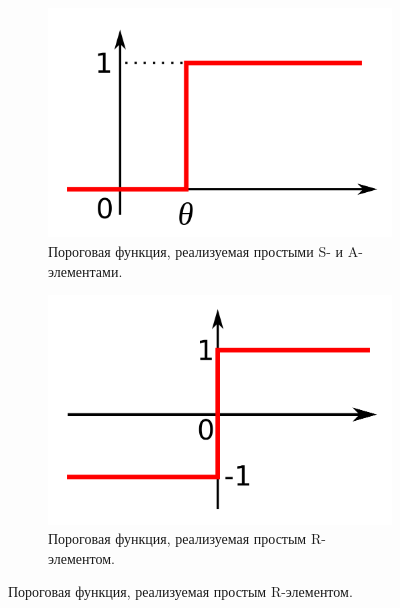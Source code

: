 \documentclass[paper=a4, fontsize=11pt]{scrartcl} %
\numberwithin{equation}{section} %
\numberwithin{figure}{section} %
\numberwithin{table}{section} %
\begin{document}
	
	\begin{figure}[h!]
		\centering
		\begin{subfigure}[b]{0.3\textwidth}
			\includegraphics[width=\textwidth]{S-A}
			\caption{Пороговая функция, реализуемая простыми S- и A-элементами.}
		\end{subfigure}
		\begin{subfigure}[b]{0.3\textwidth}
			\includegraphics[width=\textwidth]{R}
			\caption{Пороговая функция, реализуемая простым R-элементом.}
		\end{subfigure}

	\end{figure}
\end{document}
